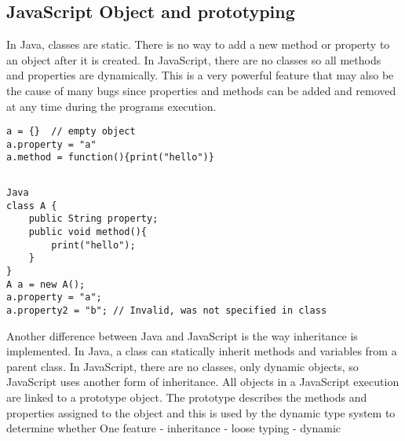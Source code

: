 \subsection{JavaScript Object and prototyping}
In Java, classes are static. There is no way to add a new method or property to an object after it is created. In JavaScript, there are no classes so all methods and properties are dynamically. This is a very powerful feature that may also be the cause of many bugs since properties and methods can be added and removed at any time during the programs execution.

\begin{lstlisting}[caption=JavaScript]
a = {} 	// empty object
a.property = "a"
a.method = function(){print("hello")}
\end{lstlisting}	

\begin{verbatim}

\end{verbatim}

\begin{verbatim}
Java
class A {
	public String property;
	public void method(){
		print("hello");
	}
}
A a = new A();
a.property = "a";
a.property2 = "b"; // Invalid, was not specified in class
\end{verbatim}
Another difference between Java and JavaScript is the way inheritance is implemented. In Java, a class can statically inherit methods and variables from a parent class. In JavaScript, there are no classes, only dynamic objects, so JavaScript uses another form of inheritance. All objects in a JavaScript execution are linked to a prototype object. The prototype describes the methods and properties assigned to the object and this is used by the dynamic type system to determine whether 
	One feature
	- inheritance
	- loose typing
	- dynamic

